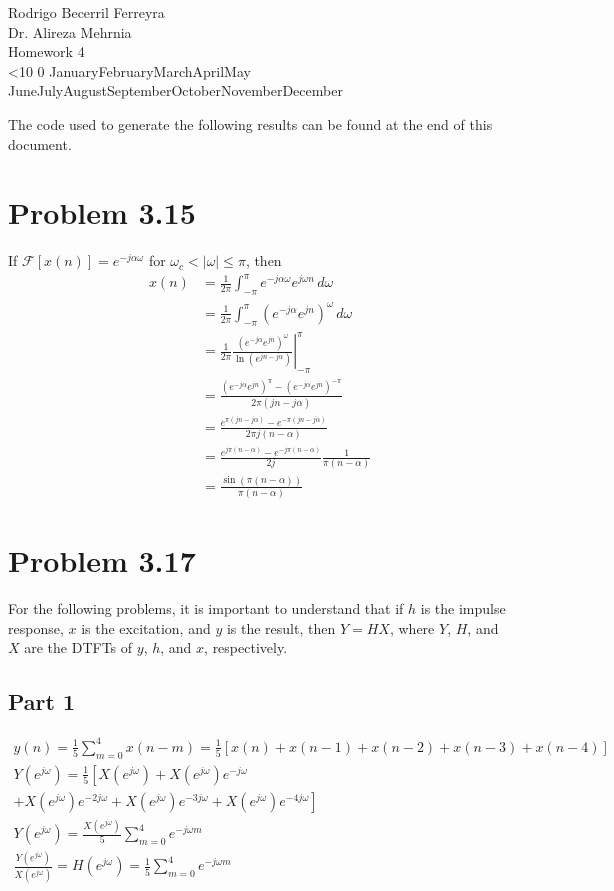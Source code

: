 \documentclass{article}
\renewcommand{\today}{\ifnum\number\day<10 0\fi \number\day \space%
\ifcase \month \or January\or February\or March\or April\or May%
\or June\or July\or August\or September\or October\or November\or December\fi\space%
\number \year}
\begin{document}
\noindent
Rodrigo Becerril Ferreyra\\
Dr. Alireza Mehrnia\\
Homework 4\\
\today

The code used to generate the following results can be found at
the end of this document.

\section*{Problem 3.15}
If \(\mathcal{F}[x(n)] = e^{-j\alpha \omega}\) for
\(\omega_c < |\omega| \le \pi\), then
\begin{align*}
    x(n) &= \frac{1}{2\pi} \int_{-\pi}^\pi e^{-j\alpha \omega} e^{j\omega n}\,d\omega\\
    &= \frac{1}{2\pi} \int_{-\pi}^\pi \left( e^{-j\alpha} e^{jn} \right)^\omega\,d\omega\\
    &= \frac{1}{2\pi} \left. \frac{\left( e^{-j\alpha} e^{jn} \right)^\omega}{\ln\left(e^{jn - j\alpha}\right)} \right|_{-\pi}^\pi\\
    &= \frac{\left( e^{-j\alpha} e^{jn} \right)^\pi - \left( e^{-j\alpha} e^{jn} \right)^{-\pi}}{2\pi(jn-j\alpha)}\\
    &= \frac{e^{\pi(jn-j\alpha)} - e^{-\pi(jn-j\alpha)}}{2\pi j(n-\alpha)} \\
    &= \frac{e^{j\pi(n-\alpha)} - e^{-j\pi(n-\alpha)}}{2 j} \frac{1}{\pi(n-\alpha)}\\
    &= \frac{\sin(\pi(n-\alpha))}{\pi(n-\alpha)}
\end{align*}

\section*{Problem 3.17}
For the following problems, it is important to understand that
if \(h\) is the impulse response, \(x\) is the excitation, and
\(y\) is the result, then \(Y = HX\), where \(Y\), \(H\), and
\(X\) are the DTFTs of \(y\), \(h\), and \(x\), respectively.

\subsection*{Part 1}
\begin{gather*}
    y(n) = \frac15 \sum_{m = 0}^4 x(n-m) = \frac15 \left[ x(n) + x(n-1) + x(n-2) + x(n-3) + x(n-4) \right]\\
    Y\left( e^{j\omega} \right) = \frac15\left[ X\left( e^{j\omega} \right) + X\left( e^{j\omega} \right)e^{-j\omega}\right.\\ \left.+ X\left( e^{j\omega} \right)e^{-2j\omega} + X\left( e^{j\omega} \right)e^{-3j\omega} + X\left( e^{j\omega} \right)e^{-4j\omega}\right]\\
    Y\left( e^{j\omega} \right) = \frac{X\left( e^{j\omega} \right)}{5} \sum_{m=0}^4 e^{-j\omega m}\\
    \frac{Y\left( e^{j\omega} \right)}{X\left( e^{j\omega} \right)} = H\left( e^{j\omega} \right) = \frac15 \sum_{m=0}^4 e^{-j\omega m}
\end{gather*}
\end{document}
